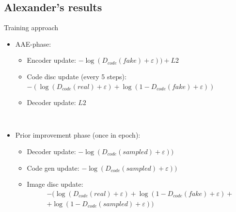\documentclass{article}
\begin{document}
    \subsection{Alexander's results}
    Training approach
    \begin{itemize}
        \item AAE-phase:\\
        \begin{itemize}
            \item Encoder update: $-\log(D_{code}(fake)+\varepsilon)) + L2$
            \item Code disc update (every 5 steps): \\ $-\left(\log(D_{code}(real)+\varepsilon) + \log(1 - D_{code}(fake)+\varepsilon)\right)$
            \item Decoder update: $L2$
        \end{itemize}\\
        \item Prior improvement phase (once in epoch):\\
        \begin{itemize}
            \item Decoder update: $-\log(D_{code}(sampled)+\varepsilon))$
            \item Code gen update: $-\log(D_{code}(sampled)+\varepsilon))$
            \item Image disc update:
            \begin{equation*}
                \begin{split}
                    &-(\log(D_{code}(real)+\varepsilon) + \log(1 - D_{code}(fake)+\varepsilon) + \\
                    &+ \log(1 - D_{code}(sampled)+\varepsilon) ) \\
                \end{split}
            \end{equation*}
        \end{itemize}
    \end{itemize}
\end{document}
